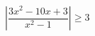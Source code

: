 \begin{ex}[type=inequality]
	\begin{condition}
		\( \left| \dfrac{3x^2-10x+3}{x^2-1} \right|\ge3 \)
	\end{condition}
	\answer{\( (-\infty;-1)\cup(-1;0]\cup\left[ \dfrac{3}{5};1 \right)\cup\left( 1;\dfrac{5}{3} \right] \)}
\end{ex}